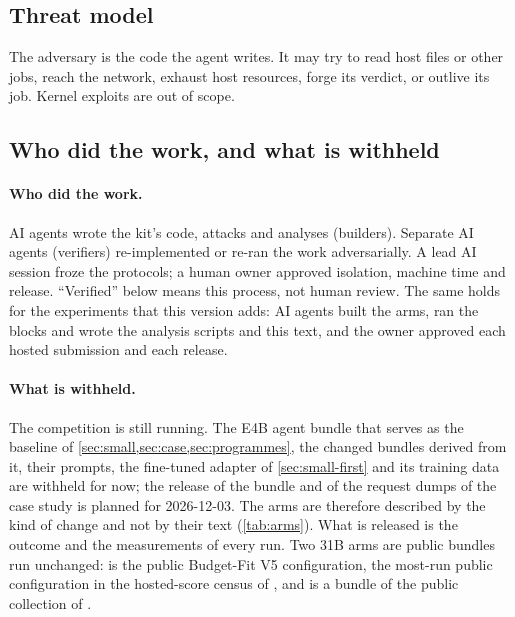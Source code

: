 \subsection{Threat model}

The adversary is the code the agent writes. It may try to read host files or other jobs, reach the network, exhaust
host resources, forge its verdict, or outlive its job. Kernel exploits are out of scope.

\subsection{Who did the work, and what is withheld}

\paragraph{Who did the work.} AI agents wrote the kit's code, attacks and analyses (builders). Separate AI agents
(verifiers) re-implemented or re-ran the work adversarially. A lead AI session froze the protocols; a human owner
approved isolation, machine time and release. ``Verified'' below means this process, not human review. The same holds
for the experiments that this version adds: AI agents built the arms, ran the blocks and wrote the analysis scripts
and this text, and the owner approved each hosted submission and each release.

\paragraph{What is withheld.} The competition is still running. The E4B agent bundle that serves as the baseline of
\cref{sec:small,sec:case,sec:programmes}, the changed bundles derived from it, their prompts, the fine-tuned adapter
of \cref{sec:small-first} and its training data are withheld for now; the release of the bundle and of the request
dumps of the case study is planned for 2026-12-03. The arms are therefore described by the kind of change and not by
their text (\cref{tab:arms}). What is released is the outcome and the measurements of every run. Two 31B arms are
public bundles run unchanged:  is the public Budget-Fit V5 configuration, the most-run public
configuration in the hosted-score census of \citet{afshar2026census}, and  is a bundle of the public collection of \citet{idris2026runs}.
